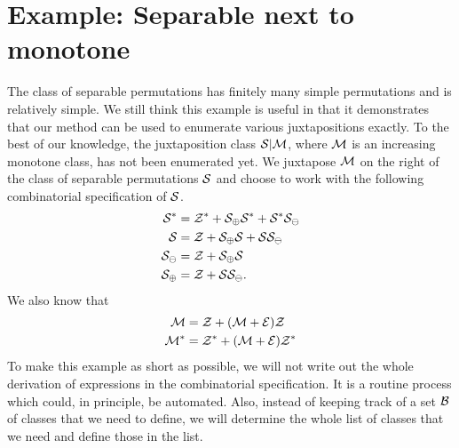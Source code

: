 \documentclass[12pt, a4paper, twoside]{report}
\begin{document}
\section{Example: Separable next to monotone}
\label{sec:example_sepav21}
The class of separable permutations has finitely many simple permutations and is relatively simple. We still think this example is useful in that it demonstrates that our method can be used to enumerate various juxtapositions exactly. To the best of our knowledge, the juxtaposition class $\S|\M$, where $\M$ is an increasing monotone class, has not been enumerated yet. We juxtapose $\M$ on the right of the class of separable permutations $\S$ and choose to work with the following combinatorial specification of $\S$.
\begin{align}
  \begin{aligned}
    \S^* &= \Z^* + \S_{\oplus}\S^* + \S^*\S_{\ominus}\\
    \S &= \Z + \S_{\oplus}\S + \S\S_{\ominus}\\
    \S_{\ominus} &= \Z + \S_\oplus\S\\
    \S_\oplus &= \Z + \S\S_\ominus.
    \label{eq:sepav21_sep}
  \end{aligned}
\end{align}
We also know that
\begin{align}
  \begin{aligned}
    \M &= \Z + (\M+\EE)\Z\\
    \Mstar &= \Zstar + (\M+\EE)\Zstar
  \end{aligned}
\end{align}
To make this example as short as possible, we will not write out the whole derivation of expressions in the combinatorial specification. It is a routine process which could, in principle, be automated. Also, instead of keeping track of a set $\B$ of classes that we need to define, we will determine the whole list of classes that we need and define those in the list.
\end{document}
